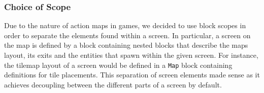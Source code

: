 \subsubsection{Choice of Scope}
Due to the nature of action maps in games, we decided to use block scopes in order to separate the elements found within a screen. 
In particular, a screen on the map is defined by a block containing nested blocks that describe the maps layout, its exits and the entities that spawn within the given screen.
For instance, the tilemap layout of a screen would be defined in a \texttt{Map} block containing definitions for tile placements.
This separation of screen elements made sense as it achieves decoupling between the different parts of a screen by default. 
